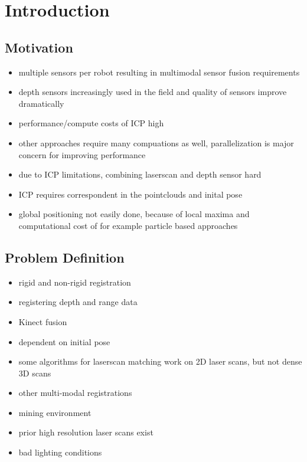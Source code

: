 \section{Introduction}

\subsection{Motivation}

\begin{itemize}
    \item multiple sensors per robot resulting in multimodal sensor fusion requirements
    \item depth sensors increasingly used in the field and quality of sensors improve dramatically
    \item performance/compute costs of ICP high
    \item other approaches require many compuations as well, parallelization is major concern for improving performance
    \item due to ICP limitations, combining laserscan and depth sensor hard
    \item ICP requires correspondent in the pointclouds and inital pose
    \item global positioning not easily done, because of local maxima and computational cost of for example particle based approaches
\end{itemize}

\subsection{Problem Definition}

\begin{itemize}
    \item rigid and non-rigid registration
    \item registering depth and range data
    \item Kinect fusion
    \item dependent on initial pose
    \item some algorithms for laserscan matching work on 2D laser scans, but not dense 3D scans
    \item other multi-modal registrations
    \item mining environment
    \item prior high resolution laser scans exist
    \item bad lighting conditions
\end{itemize}

